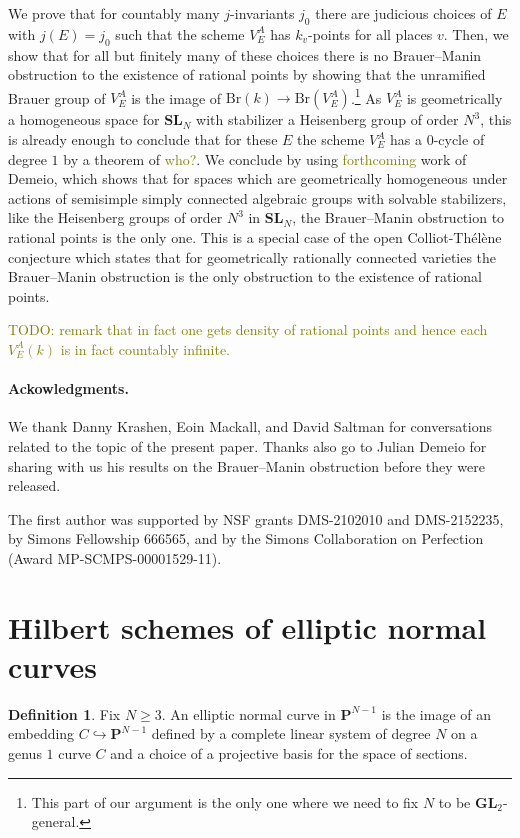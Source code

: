 \documentclass[10pt,letterpaper,twoside]{article}
\newcommand{\BA}[1]{\textcolor{olive}{#1}}
\renewcommand{\1}{\mathbf{1}}
\newcommand{\bP}{\mathbf{P}}
\renewcommand{\geq}{\geqslant}
\newcommand{\GL}{\mathbf{GL}}
\newcommand{\SL}{\mathbf{SL}}
\newcommand{\Br}{\mathrm{Br}}
\theoremstyle{plain}
\theoremstyle{plain}
\theoremstyle{definition}
\theoremstyle{named}
\theoremstyle{definition}
\newtheorem{definition}[theorem]{Definition}
\begin{document}
We prove that for countably many $j$-invariants $j_0$ there are judicious choices of $E$ with
$j(E)=j_0$ such that the scheme $V_E^A$ has $k_v$-points for all places $v$. Then, we show that for
all but finitely many of these choices there is no Brauer--Manin obstruction to the existence of
rational points by showing that the unramified Brauer group of $V_E^A$ is the image
of $\Br(k)\rightarrow\Br(V_E^A)$.\footnote{This part of our argument is the only one where we need
to fix $N$ to be $\GL_2$-general.} As $V_E^A$ is geometrically a homogeneous space for $\SL_N$ with
stabilizer a Heisenberg group of order $N^3$, this is already enough to conclude that for these $E$ the scheme $V_E^A$ has a
$0$-cycle of degree $1$ by a theorem of \BA{who?}. We conclude by using \BA{forthcoming} work of Demeio,
which shows that for spaces which are geometrically homogeneous under actions of semisimple simply
connected algebraic groups with solvable stabilizers, like the Heisenberg groups of order $N^3$ in
$\SL_N$, the Brauer--Manin obstruction to rational points is the only one.
This is a special case of the open Colliot-Th\'el\`ene conjecture which states that for geometrically
rationally connected varieties the Brauer--Manin obstruction is the only obstruction to the
existence of rational points.

\BA{TODO: remark that in fact one gets density of rational points and hence each $V_E^A(k)$ is in
fact countably infinite.}



\paragraph{Ackowledgments.}
We thank Danny Krashen, Eoin Mackall, and David Saltman for conversations related to the topic of the
present paper. Thanks also go to Julian Demeio for sharing with us his results on the Brauer--Manin
obstruction before they were released.

The first author was supported by NSF grants DMS-2102010 and DMS-2152235, by Simons Fellowship
666565, and by the Simons Collaboration on Perfection (Award MP-SCMPS-00001529-11).





\section{Hilbert schemes of elliptic normal curves}

\begin{definition}
    Fix $N\geq 3$. An elliptic normal curve in $\bP^{N-1}$ is the image of an embedding
    $C\hookrightarrow\bP^{N-1}$ defined by a complete linear system of degree $N$ on a genus $1$
    curve $C$ and a choice of a projective basis for the space of sections.
\end{definition}
\end{document}
